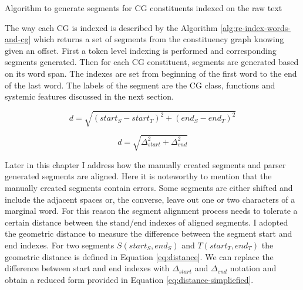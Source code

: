 \begin{algorithm}[!ht]
    \caption{Algorithm to generate segments for CG constituents indexed on the raw text}
    \label{alg:re-index-words-and-cg}
\end{algorithm}

The way each CG is indexed is described by the Algorithm \ref{alg:re-index-words-and-cg} which returns a set of segments from the constituency graph knowing given an offset. First a token level indexing is performed and corresponding segments generated. Then for each CG constituent, segments are generated based on its word span. The indexes are set from beginning of the first word to the end of the last word. The labels of the segment are the CG class, functions and systemic features discussed in the next section.

\begin{equation} \label{eq:distance}
d= \sqrt{(start_S - start_T)^{2}+(end_S-end_T)^{2}}
\end{equation}

\begin{equation} \label{eq:distance-simpliefied}
d= \sqrt{\varDelta_{start} ^{2}+\varDelta_{end}^{2}}
\end{equation}

Later in this chapter I address how the manually created segments and parser generated segments are aligned. Here it is noteworthy to mention that the manually created segments contain errors. Some segments are either shifted and include the adjacent spaces or, the converse, leave out one or two characters of a marginal word. For this reason the segment alignment process needs to tolerate a certain distance between the stand/end indexes of aligned segments. I adopted the geometric distance to measure the difference between the segment start and end indexes. For two segments $S(start_S,end_S)$ and $T(start_T,end_T)$ the geometric distance is defined in Equation \ref{eq:distance}. We can replace the difference between start and end indexes with $\varDelta_{start}$ and $\varDelta_{end}$ notation and obtain a reduced form provided in Equation \ref{eq:distance-simpliefied}.

